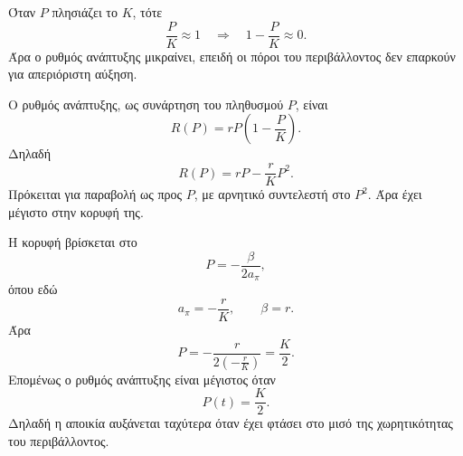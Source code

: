 \begin{alist}
        Όταν \(P\) πλησιάζει το \(K\), τότε
        \[
          \frac{P}{K}\approx1
          \quad\Rightarrow\quad
          1-\frac{P}{K}\approx0.
        \]
        Άρα ο ρυθμός ανάπτυξης μικραίνει, επειδή οι πόροι του
        περιβάλλοντος δεν επαρκούν για απεριόριστη αύξηση.

  \item Ο ρυθμός ανάπτυξης, ως συνάρτηση του πληθυσμού \(P\), είναι
        \[
          R(P)=rP\left(1-\frac{P}{K}\right).
        \]
        Δηλαδή
        \[
          R(P)=rP-\frac{r}{K}P^2.
        \]
        Πρόκειται για παραβολή ως προς \(P\), με αρνητικό συντελεστή στο
        \(P^2\). Άρα έχει μέγιστο στην κορυφή της.

        Η κορυφή βρίσκεται στο
        \[
          P=-\frac{\beta}{2a_{\pi}},
        \]
        όπου εδώ
        \[
          a_{\pi}=-\frac{r}{K},
          \qquad
          \beta=r.
        \]
        Άρα
        \[
          P
          =
          -\frac{r}{2\left(-\frac{r}{K}\right)}
          =
          \frac{K}{2}.
        \]
        Επομένως ο ρυθμός ανάπτυξης είναι μέγιστος όταν
        \[
          {P(t)=\frac{K}{2}}.
        \]
        Δηλαδή η αποικία αυξάνεται ταχύτερα όταν έχει φτάσει στο μισό
        της χωρητικότητας του περιβάλλοντος.
\end{alist}
